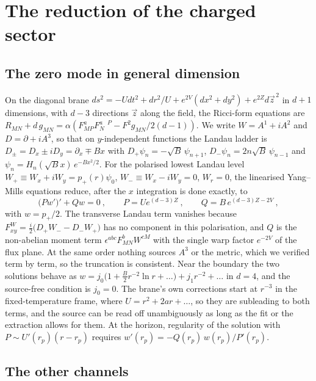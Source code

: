 \section{The reduction of the charged sector}
\label{app:charged}

\subsection{The zero mode in general dimension}
\label{app:charged-zero-mode}

On the diagonal brane
$ds^2 = -U dt^2 + dr^2/U + e^{2V}(dx^2 + dy^2) + e^{2Z}d\vec z^{\,2}$ in
$d + 1$ dimensions, with $d - 3$ directions $\vec z$ along the field, the
Ricci-form equations are $R_{MN} + d\,g_{MN} = \alpha(F^a_{MP}F^{a\phantom{N}P}_N
- F^2 g_{MN}/2(d-1))$. We write $W = A^1 + iA^2$ and $D = \partial + iA^3$,
so that on $y$-independent functions the Landau ladder is
$D_\pm = D_x \pm iD_y = \partial_x \mp Bx$ with
$D_+\psi_n = -\sqrt B\,\psi_{n+1}$, $D_-\psi_n = 2n\sqrt B\,\psi_{n-1}$ and
$\psi_n = H_n(\sqrt B x)\,e^{-Bx^2/2}$. For the polarised lowest Landau
level $W_+ \equiv W_x + iW_y = p_+(r)\psi_0$, $W_- \equiv W_x - iW_y = 0$, $W_r = 0$, the
linearised Yang--Mills equations reduce, after the $x$ integration is done
exactly, to
\begin{equation}
\big(P w'\big)' + Q w = 0~, \qquad P = U e^{(d-3)Z}~, \qquad Q = B\,e^{(d-3)Z - 2V}~,
\end{equation}
with $w = p_+/2$. The transverse Landau term vanishes because
$F^W_{xy} = \tfrac{i}{2}\big(D_+ W_- - D_- W_+\big)$ has no component in this polarisation, and
$Q$ is the non-abelian moment term $\epsilon^{abc}F^b_{MN}W^{cM}$ with the
single warp factor $e^{-2V}$ of the flux plane. At the same order nothing
sources $A^3$ or the metric, which we verified term by
term, so the truncation is consistent. Near the boundary the two solutions
behave as $w = j_0\big(1 + \tfrac{B}{2}r^{-2}\ln r + \ldots\big) + j_1 r^{-2}
+ \ldots$ in $d = 4$, and the source-free condition is $j_0 = 0$. The
brane's own corrections start at $r^{-3}$ in the fixed-temperature frame,
where $U = r^2 + 2ar + \ldots$, so they are subleading to both terms, and
the source can be read off unambiguously as long as the fit or the
extraction allows for them. At the
horizon, regularity of the solution with $P \sim U'(r_p)(r - r_p)$ requires
$w'(r_p) = -Q(r_p)\,w(r_p)/P'(r_p)$.

\subsection{The other channels}
\label{app:charged-channels}


